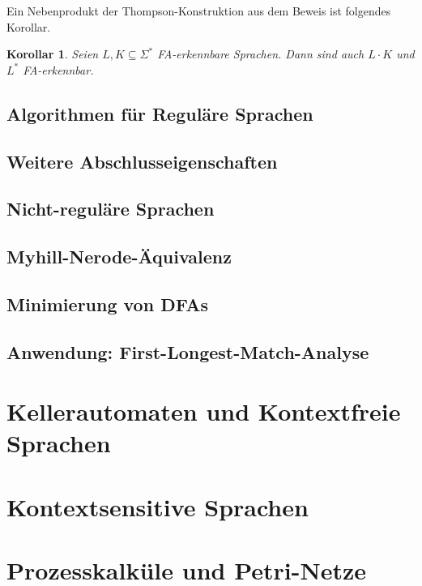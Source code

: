 \documentclass[11pt, a4paper]{article}
\theoremstyle{definition}
\theoremstyle{plain}
\newtheorem{corollary}[definition]{Korollar}
\numberwithin{equation}{section}
\begin{document}
Ein Nebenprodukt der Thompson-Konstruktion aus dem Beweis ist folgendes Korollar.
\begin{corollary}
	Seien \( L, K \subseteq \Sigma^\ast \) FA-erkennbare Sprachen. Dann sind auch \( L \cdot K \) und \( L^\ast \) FA-erkennbar.
\end{corollary}

\subsection{Algorithmen für Reguläre Sprachen}\label{sec:regular_algorithms}
\subsection{Weitere Abschlusseigenschaften}\label{sec:regular_closure2}
\subsection{Nicht-reguläre Sprachen}\label{sec:regular_nonregular}
\subsection{Myhill-Nerode-Äquivalenz}\label{sec:regular_myhill-nerode}
\subsection{Minimierung von DFAs}\label{sec:regular_minimization}
\subsection{Anwendung: First-Longest-Match-Analyse}\label{sec:regular_first-longest-match}




\newpage
\section{Kellerautomaten und Kontextfreie Sprachen}\label{sec:contextfree}

\newpage
\section{Kontextsensitive Sprachen}\label{sec:contextsensitive}

\newpage
\section{Prozesskalküle und Petri-Netze}\label{sec:process}

\newpage
{}


\end{document}
